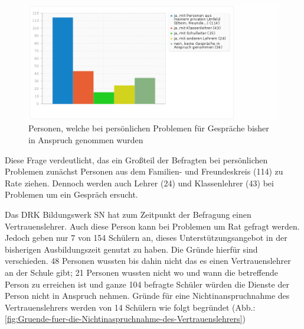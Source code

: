 \begin{figure}[hp]
	\centering
		\includegraphics[width=1.0\textwidth]{images/welche-Personen-wurden-bisher-bei-persoenlichen-Problemen-in-der-zurueckliegenden-Ausbildungszeit-fuer-Gespraeche-in-Anspruch-genommen.png}
	\caption{Personen, welche bei persönlichen Problemen für Gespräche bisher in Anspruch genommen wurden}
	\label{fig:welche-Personen-wurden-bisher bei-persoenlichen-Problemen-in-der-zurueckliegenden-Ausbildungszeit-fuer-Gespraeche-in-Anspruch-genommen}
\end{figure}

\noindent
Diese Frage verdeutlicht, das ein Großteil der Befragten bei persönlichen Problemen zunächst Personen aus dem Familien- und Freundeskreis (114) zu Rate ziehen. Dennoch werden auch Lehrer (24) und Klassenlehrer (43) bei Problemen um ein Gespräch ersucht.

Das DRK Bildungswerk SN hat zum Zeitpunkt der Befragung einen Vertrauenslehrer. Auch diese Person kann bei Problemen um Rat gefragt werden. Jedoch geben nur 7 von 154 Schülern an, dieses Unterstützungsangebot in der bisherigen Ausbildungszeit genutzt zu haben. Die Gründe hierfür sind verschieden. 48 Personen wussten bis dahin nicht das es einen Vertrauenslehrer an der Schule gibt; 21 Personen wussten nicht wo und wann die betreffende Person zu erreichen ist und ganze 104 befragte Schüler würden die Dienste der Person nicht in Anspruch nehmen. Gründe für eine Nichtinanspruchnahme des Vertrauenslehrers werden von 14 Schülern wie folgt begründet (Abb.: \ref{fig:Gruende-fuer-die-Nichtinaspruchnahme-des-Vertrauenslehrers})

